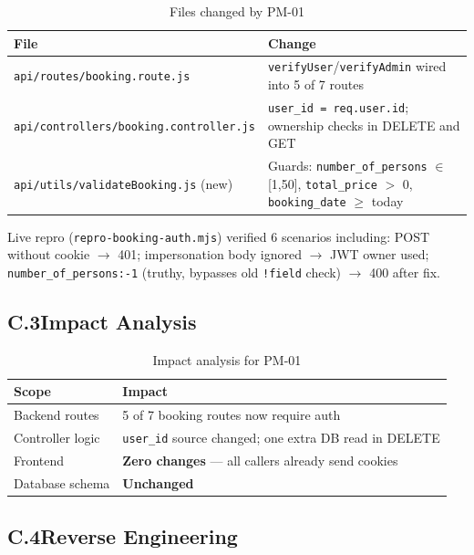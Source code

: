 \documentclass[11pt,a4paper]{article}
\begin{document}
\begin{table}[H]
\centering\small
\begin{tabularx}{\textwidth}{@{}lX@{}}
\toprule
\textbf{File} & \textbf{Change} \\
\midrule
\texttt{api/routes/booking.route.js} &
  \texttt{verifyUser}/\texttt{verifyAdmin} wired into 5 of 7 routes \\
\texttt{api/controllers/booking.controller.js} &
  \texttt{user\_id = req.user.id}; ownership checks in DELETE and GET \\
\texttt{api/utils/validateBooking.js} (new) &
  Guards: \texttt{number\_of\_persons} $\in$ [1,50], \texttt{total\_price} $>$ 0,
  \texttt{booking\_date} $\geq$ today \\
\bottomrule
\end{tabularx}
\caption{Files changed by PM-01}
\end{table}

Live repro (\texttt{repro-booking-auth.mjs}) verified 6 scenarios including:
POST without cookie $\to$ 401; impersonation body ignored $\to$ JWT owner used;
\texttt{number\_of\_persons:-1} (truthy, bypasses old \texttt{!field} check) $\to$ 400 after fix.

\subsection{C.3\quad Impact Analysis}

\begin{table}[H]
\centering\small
\begin{tabularx}{\textwidth}{@{}lX@{}}
\toprule
\textbf{Scope} & \textbf{Impact} \\
\midrule
Backend routes   & 5 of 7 booking routes now require auth \\
Controller logic & \texttt{user\_id} source changed; one extra DB read in DELETE \\
Frontend         & \textbf{Zero changes} --- all callers already send cookies \\
Database schema  & \textbf{Unchanged} \\
\bottomrule
\end{tabularx}
\caption{Impact analysis for PM-01}
\end{table}

\subsection{C.4\quad Reverse Engineering}
\end{document}
